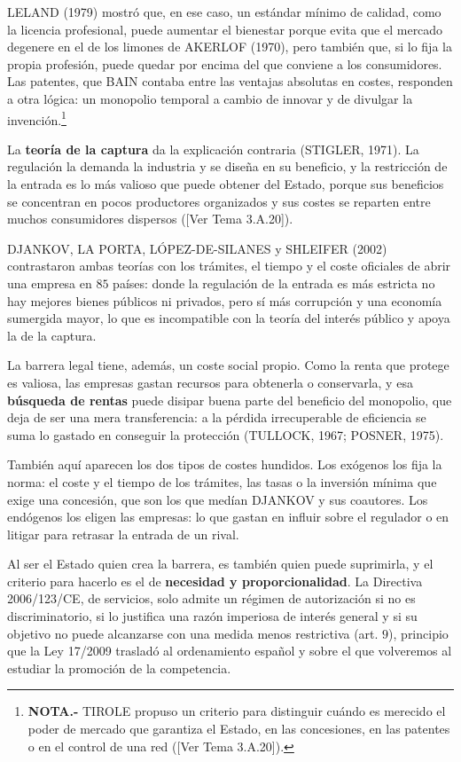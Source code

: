 \documentclass[10pt,a4paper]{article}
\newcommand{\authorfont}[1]{{\fontfamily{EBGaramond-TLF}\selectfont #1}}
\begin{document}
LELAND (1979) mostró que, en ese caso, un estándar mínimo de calidad, como la licencia profesional, puede aumentar el bienestar porque evita que el mercado degenere en el de los limones de AKERLOF (1970), pero también que, si lo fija la propia profesión, puede quedar por encima del que conviene a los consumidores. Las patentes, que BAIN contaba entre las ventajas absolutas en costes, responden a otra lógica: un monopolio temporal a cambio de innovar y de divulgar la invención.\footnote{%
  \textbf{NOTA.-} TIROLE propuso un criterio para distinguir cuándo es merecido el poder de mercado que garantiza el Estado, en las concesiones, en las patentes o en el control de una red ([\authorfont{Ver Tema 3.A.20}]).
}

La \textbf{teoría de la captura} da la explicación contraria (STIGLER, 1971). La regulación la demanda la industria y se diseña en su beneficio, y la restricción de la entrada es lo más valioso que puede obtener del Estado, porque sus beneficios se concentran en pocos productores organizados y sus costes se reparten entre muchos consumidores dispersos ([\authorfont{Ver Tema 3.A.20}]).

DJANKOV, LA PORTA, LÓPEZ-DE-SILANES y SHLEIFER (2002) contrastaron ambas teorías con los trámites, el tiempo y el coste oficiales de abrir una empresa en $85$ países: donde la regulación de la entrada es más estricta no hay mejores bienes públicos ni privados, pero sí más corrupción y una economía sumergida mayor, lo que es incompatible con la teoría del interés público y apoya la de la captura.

La barrera legal tiene, además, un coste social propio. Como la renta que protege es valiosa, las empresas gastan recursos para obtenerla o conservarla, y esa \textbf{búsqueda de rentas} puede disipar buena parte del beneficio del monopolio, que deja de ser una mera transferencia: a la pérdida irrecuperable de eficiencia se suma lo gastado en conseguir la protección (TULLOCK, 1967; POSNER, 1975).

También aquí aparecen los dos tipos de costes hundidos. Los exógenos los fija la norma: el coste y el tiempo de los trámites, las tasas o la inversión mínima que exige una concesión, que son los que medían DJANKOV y sus coautores. Los endógenos los eligen las empresas: lo que gastan en influir sobre el regulador o en litigar para retrasar la entrada de un rival.

Al ser el Estado quien crea la barrera, es también quien puede suprimirla, y el criterio para hacerlo es el de \textbf{necesidad y proporcionalidad}. La Directiva 2006/123/CE, de servicios, solo admite un régimen de autorización si no es discriminatorio, si lo justifica una razón imperiosa de interés general y si su objetivo no puede alcanzarse con una medida menos restrictiva (art. $9$), principio que la Ley 17/2009 trasladó al ordenamiento español y sobre el que volveremos al estudiar la promoción de la competencia.
\end{document}
